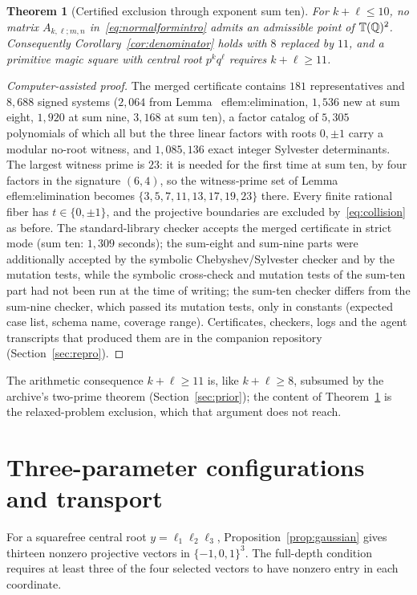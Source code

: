 \documentclass[11pt,letterpaper]{article}
\newtheorem{theorem}{Theorem}[section]
\theoremstyle{definition}\newtheorem{definition}[theorem]{Definition}
\theoremstyle{remark}\newtheorem{remark}[theorem]{Remark}
\newcommand{\Q}{\mathbb Q}\newcommand{\Z}{\mathbb Z}\newcommand{\R}{\mathbb R}
\begin{document}
\begin{theorem}[Certified exclusion through exponent sum ten]\label{thm:sumnine}
For $k+\ell\le10$, no matrix $A_{k,\ell;m,n}$ in~\eqref{eq:normalformintro} admits an admissible point of $\T(\Q)^2$. Consequently Corollary~\ref{cor:denominator} holds with $8$ replaced by $11$, and a primitive magic square with central root $p^kq^\ell$ requires $k+\ell\ge11$.
\end{theorem}
\begin{proof}[Computer-assisted proof]
The merged certificate contains $181$ representatives and $8{,}688$ signed systems ($2{,}064$ from Lemma~
ef{lem:elimination}, $1{,}536$ new at sum eight, $1{,}920$ at sum nine, $3{,}168$ at sum ten), a factor catalog of $5{,}305$ polynomials of which all but the three linear factors with roots $0,\pm1$ carry a modular no-root witness, and $1{,}085{,}136$ exact integer Sylvester determinants. The largest witness prime is $23$: it is needed for the first time at sum ten, by four factors in the signature $(6,4)$, so the witness-prime set of Lemma~
ef{lem:elimination} becomes $\{3,5,7,11,13,17,19,23\}$ there. Every finite rational fiber has $t\in\{0,\pm1\}$, and the projective boundaries are excluded by~\eqref{eq:collision} as before. The standard-library checker accepts the merged certificate in strict mode (sum ten: $1{,}309$ seconds); the sum-eight and sum-nine parts were additionally accepted by the symbolic Chebyshev/Sylvester checker and by the mutation tests, while the symbolic cross-check and mutation tests of the sum-ten part had not been run at the time of writing; the sum-ten checker differs from the sum-nine checker, which passed its mutation tests, only in constants (expected case list, schema name, coverage range). Certificates, checkers, logs and the agent transcripts that produced them are in the companion repository (Section~\ref{sec:repro}).
\end{proof}
The arithmetic consequence $k+\ell\ge11$ is, like $k+\ell\ge8$, subsumed by the archive's two-prime theorem (Section~\ref{sec:prior}); the content of Theorem~\ref{thm:sumnine} is the relaxed-problem exclusion, which that argument does not reach.

\section{Three-parameter configurations and transport}\label{sec:three}
For a squarefree central root $y=\ell_1\ell_2\ell_3$, Proposition~\ref{prop:gaussian} gives thirteen nonzero projective vectors in $\{-1,0,1\}^3$. The full-depth condition requires at least three of the four selected vectors to have nonzero entry in each coordinate.
\end{document}
